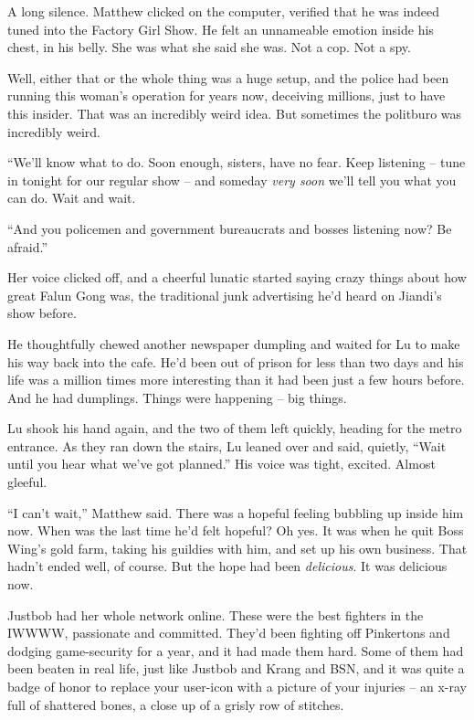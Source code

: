 A long silence. Matthew clicked on the computer, verified that he
was indeed tuned into the Factory Girl Show. He felt an unnameable
emotion inside his chest, in his belly. She was what she said she
was. Not a cop. Not a spy.

Well, either that or the whole thing was a huge setup, and the
police had been running this woman's operation for years now,
deceiving millions, just to have this insider. That was an
incredibly weird idea. But sometimes the politburo was incredibly
weird.

``We'll know what to do. Soon enough, sisters, have no fear. Keep
listening -- tune in tonight for our regular show -- and someday
\emph{very soon} we'll tell you what you can do. Wait and wait.

``And you policemen and government bureaucrats and bosses listening
now? Be afraid.''

Her voice clicked off, and a cheerful lunatic started saying crazy
things about how great Falun Gong was, the traditional junk
advertising he'd heard on Jiandi's show before.

He thoughtfully chewed another newspaper dumpling and waited for Lu
to make his way back into the cafe. He'd been out of prison for
less than two days and his life was a million times more
interesting than it had been just a few hours before. And he had
dumplings. Things were happening -- big things.

Lu shook his hand again, and the two of them left quickly, heading
for the metro entrance. As they ran down the stairs, Lu leaned over
and said, quietly, ``Wait until you hear what we've got planned.''
His voice was tight, excited. Almost gleeful.

``I can't wait,'' Matthew said. There was a hopeful feeling bubbling
up inside him now. When was the last time he'd felt hopeful? Oh
yes. It was when he quit Boss Wing's gold farm, taking his guildies
with him, and set up his own business. That hadn't ended well, of
course. But the hope had been \emph{delicious}. It was delicious
now.

\tb

Justbob had her whole network online. These were the best fighters
in the IWWWW, passionate and committed. They'd been fighting off
Pinkertons and dodging game-security for a year, and it had made
them hard. Some of them had been beaten in real life, just like
Justbob and Krang and BSN, and it was quite a badge of honor to
replace your user-icon with a picture of your injuries -- an x-ray
full of shattered bones, a close up of a grisly row of stitches.

